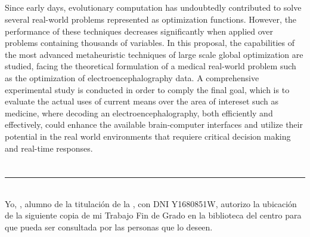 \begin{center}
{\large\bfseries \myTitleEng}\\
\end{center}
\begin{center}
\myName\\
\end{center}

\\

\vspace{0.7cm}
\\

Since early days, evolutionary computation has undoubtedly contributed to solve several real-world problems represented as optimization functions. However, the performance of these techniques decreases significantly when applied over problems containing thousands of variables. In this proposal, the capabilities of the most advanced metaheuristic techniques of large scale global optimization are studied, facing the theoretical formulation of a medical real-world problem such as the optimization of electroencephalography data. A comprehensive experimental study is conducted in order to comply the final goal, which is to evaluate the actual uses of current means over the area of intereset such as medicine, where decoding an electroencephalography, both efficiently and effectively, could enhance the available brain-computer interfaces and utilize their potential in the real world environments that requiere critical decision making and real-time responses.

\chapter*{}
\thispagestyle{empty}

\noindent\rule[-1ex]{\textwidth}{2pt}\\[4.5ex]

Yo, \textbf{\myName}, alumno de la titulación \myDegree de la \textbf{\myFaculty}, con DNI Y1680851W, autorizo la
ubicación de la siguiente copia de mi Trabajo Fin de Grado en la biblioteca del centro para que pueda ser
consultada por las personas que lo deseen.

\vspace{6cm}

